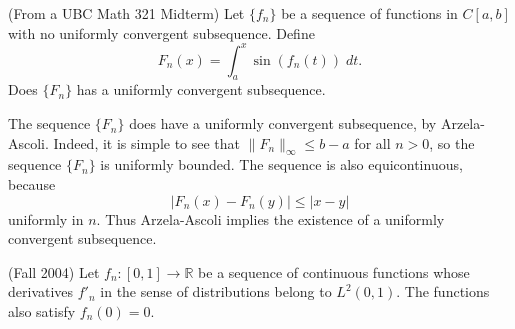 \documentclass[answers]{exam}
\theoremstyle{problemstyle}
\newcommand{\1}[1]{\textbf{1}_{\left[#1\right]}} %
\def\R{\mathbb{R}} %
\begin{document}
\begin{questions}
\question (From a UBC Math 321 Midterm) Let $\{ f_n \}$ be a sequence of functions in $C[a,b]$ with no uniformly convergent subsequence. Define
%
\[ F_n(x) = \int_a^x \sin(f_n(t))\; dt. \]
%
Does $\{ F_n \}$ has a uniformly convergent subsequence.
\begin{solution}
    The sequence $\{ F_n \}$ does have a uniformly convergent subsequence, by Arzela-Ascoli. Indeed, it is simple to see that $\| F_n \|_\infty \leq b - a$ for all $n > 0$, so the sequence $\{ F_n \}$ is uniformly bounded. The sequence is also equicontinuous, because
    \[ |F_n(x) - F_n(y)| \leq |x - y| \]
    uniformly in $n$. Thus Arzela-Ascoli implies the existence of a uniformly convergent subsequence.
\end{solution}

\question (Fall 2004) Let $f_{n}:[0,1]\to \R$ be a sequence of continuous functions whose derivatives $f'_{n}$ in the sense of distributions belong to $L^{2}(0,1)$. The functions also satisfy $f_{n}(0)=0$.
\begin{parts}

\end{parts}
\end{questions}
\end{document}
